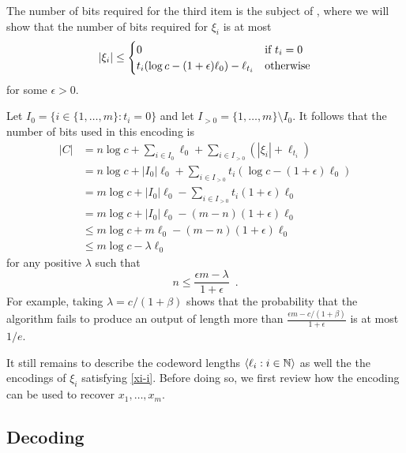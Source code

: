 \documentclass{patmorin}
\begin{document}
The number of bits required for the third item is the subject of , where we will show that the number of bits required for $\xi_i$ is at most
\begin{equation}
   |\xi_i| 
   \le \begin{cases}
     0 & \text{if $t_i=0$} \\
     t_i(\log c - (1+\epsilon)\ell_0) - \ell_{t_i} 
        & \text{otherwise}
   \end{cases}  \eqlabel{xi-i}
\end{equation}
for some $\epsilon > 0$.

Let $I_0=\{i\in\{1,\ldots,m\}: t_i=0\}$ and let $I_{>0}=\{1,\ldots,m\}\setminus I_0$.
It follows that the number of bits used in this encoding is
\begin{align*}
    |C| 
    & = n\log c + \sum_{i\in I_0} \ell_0
       + \sum_{i\in I_{>0}} (|\xi_i| + \ell_{t_i}) \\
       & = n\log c + |I_0|\ell_0
          + \sum_{i\in I_{>0}} t_i(\log c - (1+\epsilon)\ell_0) \\
       & = m\log c + |I_0|\ell_0
           - \sum_{i\in I_{>0}} t_i(1+\epsilon)\ell_0 \\
       & = m\log c + |I_0|\ell_0
           - (m-n)(1+\epsilon)\ell_0 \\
       & \le m\log c + m\ell_0
           - (m-n)(1+\epsilon)\ell_0 \\
       & \le m\log c - \lambda\ell_0
\end{align*}
for any positive $\lambda$ such that
\[
     n \le \frac{\epsilon m-\lambda}{1+\epsilon} \enspace .
\]
For example, taking $\lambda = c/(1+\beta)$ shows that the probability that the algorithm fails to produce an output of length more than $\frac{\epsilon m-c/(1+\beta)}{1+\epsilon}$ is at most $1/e$.

It still remains to describe the codeword lengths $\langle \ell_i:i\in \mathbb{N}\rangle$ as well the the encodings of $\xi_i$ satisfying \eqref{xi-i}.  Before doing so, we first review how the encoding can be used to recover $x_1,\ldots,x_m$.


\subsection{Decoding}
\end{document}
